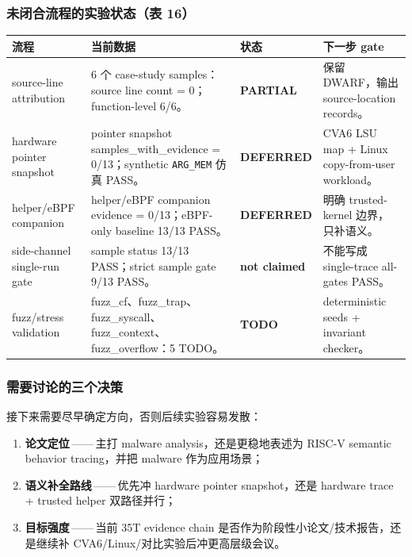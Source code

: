 \documentclass[aspectratio=169,10pt]{beamer}
\newcommand{\tagwarn}[1]{\textcolor{rvorange}{\textbf{#1}}}
\begin{document}
\begin{frame}
  \frametitle{未闭合流程的实验状态（表 16）}
  \vskip0.05cm
  \begin{center}\scriptsize
  \renewcommand{\arraystretch}{1.13}
  \begin{tabularx}{0.97\linewidth}{@{}L{2.9cm}L{2.7cm}L{2.35cm}Y@{}}
    \toprule
    \textbf{流程} & \textbf{当前数据} & \textbf{状态} & \textbf{下一步 gate} \\
    \midrule
    source-line attribution & 6 个 case-study samples：source line count = 0；function-level 6/6。 & \tagwarn{PARTIAL} & 保留 DWARF，输出 source-location records。 \\
    hardware pointer snapshot & pointer snapshot samples\_with\_evidence = 0/13；synthetic \texttt{ARG\_MEM} 仿真 PASS。 & \tagwarn{DEFERRED} & CVA6 LSU map + Linux copy-from-user workload。 \\
    helper/eBPF companion & helper/eBPF companion evidence = 0/13；eBPF-only baseline 13/13 PASS。 & \tagwarn{DEFERRED} & 明确 trusted-kernel 边界，只补语义。 \\
    side-channel single-run gate & sample status 13/13 PASS；strict sample gate 9/13 PASS。 & \tagwarn{not claimed} & 不能写成 single-trace all-gates PASS。 \\
    fuzz/stress validation & fuzz\_cf、fuzz\_trap、fuzz\_syscall、fuzz\_context、fuzz\_overflow：5 TODO。 & \tagwarn{TODO} & deterministic seeds + invariant checker。 \\
    \bottomrule
  \end{tabularx}
  \end{center}
\end{frame}

\begin{frame}
  \frametitle{需要讨论的三个决策}
  \vskip0.15cm

  接下来需要尽早确定方向，否则后续实验容易发散：

  \vskip0.2cm
  \begin{enumerate}\setlength\itemsep{0.55em}
    \item \textbf{论文定位}\,——\,主打 malware analysis，还是更稳地表述为 RISC-V semantic behavior tracing，并把 malware 作为应用场景；
    \item \textbf{语义补全路线}\,——\,优先冲 hardware pointer snapshot，还是 hardware trace + trusted helper 双路径并行；
    \item \textbf{目标强度}\,——\,当前 35T evidence chain 是否作为阶段性小论文/技术报告，还是继续补 CVA6/Linux/对比实验后冲更高层级会议。
  \end{enumerate}

  \vskip0.22cm
\end{frame}
\end{document}
